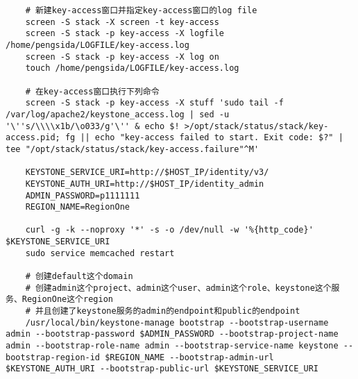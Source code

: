 \documentclass[a4paper,left=1.5cm,right=1.5cm,11pt]{article}
\begin{document}
\begin{lstlisting}
	# 新建key-access窗口并指定key-access窗口的log file
	screen -S stack -X screen -t key-access
	screen -S stack -p key-access -X logfile /home/pengsida/LOGFILE/key-access.log
	screen -S stack -p key-access -X log on
	touch /home/pengsida/LOGFILE/key-access.log

	# 在key-access窗口执行下列命令
	screen -S stack -p key-access -X stuff 'sudo tail -f /var/log/apache2/keystone_access.log | sed -u '\''s/\\\\x1b/\o033/g'\'' & echo $! >/opt/stack/status/stack/key-access.pid; fg || echo "key-access failed to start. Exit code: $?" | tee "/opt/stack/status/stack/key-access.failure"^M'

	KEYSTONE_SERVICE_URI=http://$HOST_IP/identity/v3/
	KEYSTONE_AUTH_URI=http://$HOST_IP/identity_admin
	ADMIN_PASSWORD=p1111111
	REGION_NAME=RegionOne

	curl -g -k --noproxy '*' -s -o /dev/null -w '%{http_code}' $KEYSTONE_SERVICE_URI
	sudo service memcached restart
	
	# 创建default这个domain
	# 创建admin这个project、admin这个user、admin这个role、keystone这个服务、RegionOne这个region
	# 并且创建了keystone服务的admin的endpoint和public的endpoint
	/usr/local/bin/keystone-manage bootstrap --bootstrap-username admin --bootstrap-password $ADMIN_PASSWORD --bootstrap-project-name admin --bootstrap-role-name admin --bootstrap-service-name keystone --bootstrap-region-id $REGION_NAME --bootstrap-admin-url $KEYSTONE_AUTH_URI --bootstrap-public-url $KEYSTONE_SERVICE_URI
	\end{lstlisting}
\end{document}
